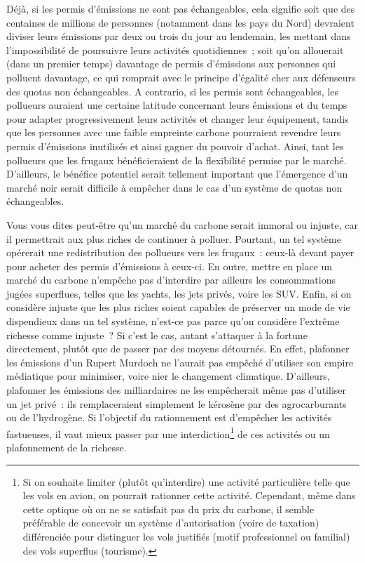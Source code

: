 \documentclass[a5paper,french,openany]{memoir}
\begin{document}
Déjà, si les permis d'émissions ne sont pas échangeables, cela signifie soit que des centaines de millions de personnes (notamment dans les pays du Nord) devraient diviser leurs émissions par deux ou trois du jour au lendemain, les mettant dans l'impossibilité de poursuivre leurs activités quotidiennes~; soit qu'on allouerait (dans un premier temps) davantage de permis d'émissions aux personnes qui polluent davantage, ce qui romprait avec le principe d'égalité cher aux défenseurs des quotas non échangeables. A contrario, si les permis sont échangeables, les pollueurs auraient une certaine latitude concernant leurs émissions et du temps pour adapter progressivement leurs activités et changer leur équipement, tandis que les personnes avec une faible empreinte carbone pourraient revendre leurs permis d'émissions inutilisés et ainsi gagner du pouvoir d'achat. Ainsi, tant les pollueurs que les frugaux bénéficieraient de la flexibilité permise par le marché. D'ailleurs, le bénéfice potentiel serait tellement important que l'émergence d'un marché noir serait difficile à empêcher dans le cas d'un système de quotas non échangeables. 

Vous vous dites peut-être qu'un marché du carbone serait immoral ou injuste, car il permettrait aux plus riches de continuer à polluer. Pourtant, un tel système opérerait une redistribution des pollueurs vers les frugaux~: ceux-là devant payer pour acheter des permis d'émissions à ceux-ci. En outre, mettre en place un marché du carbone n'empêche pas d'interdire par ailleurs les consommations jugées superflues, telles que les yachts, les jets privés, voire les SUV. Enfin, si on considère injuste que les plus riches soient capables de préserver un mode de vie dispendieux dans un tel système, n'est-ce pas parce qu'on considère l'extrême richesse comme injuste~? Si c'est le cas, autant s'attaquer à la fortune directement, plutôt que de passer par des moyens détournés. En effet, plafonner les émissions d'un Rupert Murdoch ne l'aurait pas empêché d'utiliser son empire médiatique pour minimiser, voire nier le changement climatique. D'ailleurs, plafonner les émissions des milliardaires ne les empêcherait même pas d'utiliser un jet privé~: ils remplaceraient simplement le kérosène par des agrocarburants ou de l'hydrogène. Si l'objectif du rationnement est d'empêcher les activités fastueuses, %
il vaut mieux passer par une interdiction\footnote{Si on souhaite limiter (plutôt qu'interdire) une activité particulière telle que les vols en avion, on pourrait rationner cette activité. Cependant, même dans cette optique où on ne se satisfait pas du prix du carbone, il semble préférable de concevoir un système d'autorisation (voire de taxation) différenciée pour distinguer les vols justifiés (motif professionnel ou familial) des vols superflus (tourisme). 
} de ces activités ou un plafonnement de la richesse.  %
\end{document}
